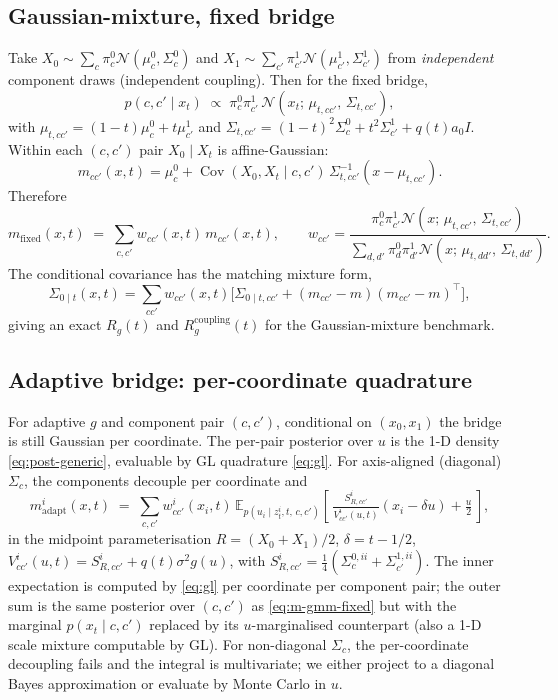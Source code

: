 \documentclass[11pt]{article}
\newcommand{\E}{\mathbb{E}}
\newcommand{\Cov}{\operatorname{Cov}}
\newcommand{\N}{\mathcal{N}}
\begin{document}
\subsection{Gaussian-mixture, fixed bridge}
\label{sec:bayes-gmm}

Take $X_0\sim\sum_c \pi_c^{0}\N(\mu_c^{0},\Sigma_c^{0})$ and
$X_1\sim\sum_{c'}\pi_{c'}^{1}\N(\mu_{c'}^{1},\Sigma_{c'}^{1})$ from
\emph{independent} component draws (independent coupling). Then for the
fixed bridge,
\[
    p(c, c'\mid x_t) \;\propto\; \pi_c^{0}\pi_{c'}^{1}\,\N(x_t;\,\mu_{t,cc'},\,\Sigma_{t,cc'}),
\]
with $\mu_{t,cc'} = (1-t)\mu_c^{0} + t\mu_{c'}^{1}$ and
$\Sigma_{t,cc'} = (1-t)^2\Sigma_c^{0} + t^2\Sigma_{c'}^{1} + q(t) a_0 I$.
Within each $(c,c')$ pair $X_0\mid X_t$ is affine-Gaussian:
\[
    m_{cc'}(x,t) = \mu_c^{0} + \Cov(X_0,X_t\mid c,c')\,\Sigma_{t,cc'}^{-1}(x - \mu_{t,cc'}).
\]
Therefore
\begin{equation}
    \boxed{
    m_{\text{fixed}}(x,t) \;=\; \sum_{c,c'} w_{cc'}(x,t)\, m_{cc'}(x,t),
    \qquad
    w_{cc'} = \frac{\pi_c^{0}\pi_{c'}^{1}\N(x;\,\mu_{t,cc'},\,\Sigma_{t,cc'})}{\sum_{d,d'} \pi_d^{0}\pi_{d'}^{1}\N(x;\,\mu_{t,dd'},\,\Sigma_{t,dd'})}.
    }
    \label{eq:m-gmm-fixed}
\end{equation}
The conditional covariance has the matching mixture form,
\begin{equation}
    \Sigma_{0\mid t}(x,t) = \sum_{cc'} w_{cc'}(x,t)\big[\Sigma_{0\mid t,cc'} + (m_{cc'}-m)(m_{cc'}-m)^\top\big],
    \label{eq:cov-gmm}
\end{equation}
giving an exact $R_g(t)$ and $R_g^{\text{coupling}}(t)$ for the
Gaussian-mixture benchmark.

\subsection{Adaptive bridge: per-coordinate quadrature}
\label{sec:bayes-adapt}

For adaptive $g$ and component pair $(c,c')$, conditional on
$(x_0, x_1)$ the bridge is still Gaussian per coordinate. The per-pair
posterior over $u$ is the 1-D density \eqref{eq:post-generic}, evaluable
by GL quadrature \eqref{eq:gl}. For axis-aligned (diagonal) $\Sigma_c$,
the components decouple per coordinate and
\begin{equation}
    \boxed{
    m_{\text{adapt}}^i(x,t) \;=\; \sum_{c,c'} w_{cc'}^{i}(x_i,t)\,
    \E_{p(u_i\mid z_t^i, t,\, c, c')}\!\left[\,\tfrac{S_{R,cc'}^i}{V^i_{cc'}(u,t)}(x_i - \delta u) + \tfrac{u}{2}\,\right],
    }
    \label{eq:m-adapt-gmm}
\end{equation}
in the midpoint parameterisation $R = (X_0+X_1)/2$, $\delta = t-1/2$,
$V_{cc'}^i(u,t) = S_{R,cc'}^i + q(t)\sigma^2 g(u)$, with
$S_{R,cc'}^i = \tfrac14(\Sigma_c^{0,ii} + \Sigma_{c'}^{1,ii})$. The
inner expectation is computed by \eqref{eq:gl} per coordinate per
component pair; the outer sum is the same posterior over $(c,c')$ as
\eqref{eq:m-gmm-fixed} but with the marginal $p(x_t\mid c,c')$ replaced
by its $u$-marginalised counterpart (also a 1-D scale mixture
computable by GL). For non-diagonal $\Sigma_c$, the per-coordinate
decoupling fails and the integral is multivariate; we either project to
a diagonal Bayes approximation or evaluate by Monte Carlo in $u$.
\end{document}
